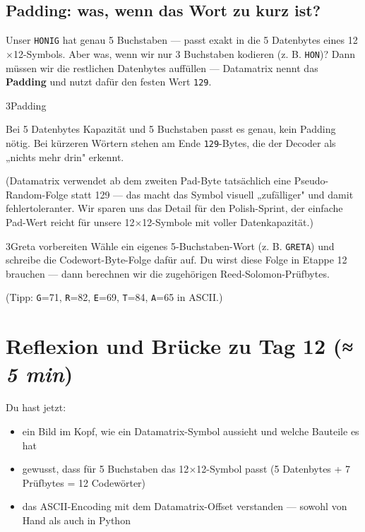 \subsection*{Padding: was, wenn das Wort zu kurz ist?}

Unser \texttt{HONIG} hat genau 5 Buchstaben — passt exakt in die 5
Datenbytes eines 12$\times$12-Symbols. Aber was, wenn wir nur 3
Buchstaben kodieren (z. B. \texttt{HON})? Dann müssen wir die
restlichen Datenbytes auffüllen — Datamatrix nennt das
\textbf{Padding} und nutzt dafür den festen Wert \texttt{129}.

\begin{pythoneinheit}{3}{Padding}

Bei 5 Datenbytes Kapazität und 5 Buchstaben passt es genau, kein
Padding nötig. Bei kürzeren Wörtern stehen am Ende
\texttt{129}-Bytes, die der Decoder als „nichts mehr drin" erkennt.

(Datamatrix verwendet ab dem zweiten Pad-Byte tatsächlich eine
Pseudo-Random-Folge statt 129 — das macht das Symbol visuell
„zufälliger" und damit fehlertoleranter. Wir sparen uns das Detail
für den Polish-Sprint, der einfache Pad-Wert reicht für unsere
12$\times$12-Symbole mit voller Datenkapazität.)
\end{pythoneinheit}

\begin{bleistiftuebung}{3}{Greta vorbereiten}
Wähle ein eigenes 5-Buchstaben-Wort (z. B. \texttt{GRETA}) und
schreibe die Codewort-Byte-Folge dafür auf. Du wirst diese Folge
in Etappe 12 brauchen — dann berechnen wir die zugehörigen
Reed-Solomon-Prüfbytes.

(Tipp: \texttt{G}=71, \texttt{R}=82, \texttt{E}=69, \texttt{T}=84,
\texttt{A}=65 in ASCII.)
\end{bleistiftuebung}

\section{Reflexion und Brücke zu Tag 12 \normalfont(\textit{≈ 5 min})}

Du hast jetzt:

\begin{itemize}
\item ein Bild im Kopf, wie ein Datamatrix-Symbol aussieht und welche
  Bauteile es hat
\item gewusst, dass für 5 Buchstaben das 12$\times$12-Symbol passt
  (5 Datenbytes + 7 Prüfbytes = 12 Codewörter)
\item das ASCII-Encoding mit dem Datamatrix-Offset verstanden — sowohl
  von Hand als auch in Python
\end{itemize}

